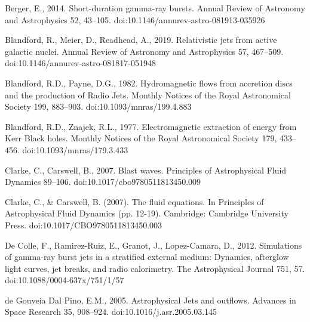 \documentclass[12pt,a4paper]{book}
\begin{document}
\begin{thebibliography}{40}

Berger, E., 2014. Short-duration gamma-ray bursts. Annual Review of Astronomy and Astrophysics 52, 43–105. doi:10.1146/annurev-astro-081913-035926 

 Blandford, R., Meier, D., Readhead, A., 2019. Relativistic jets from active galactic nuclei. Annual Review of Astronomy and Astrophysics 57, 467–509. doi:10.1146/annurev-astro-081817-051948 

 Blandford, R.D., Payne, D.G., 1982. Hydromagnetic flows from accretion discs and the production of Radio Jets. Monthly Notices of the Royal Astronomical Society 199, 883–903. 
doi:10.1093/mnras/199.4.883 

 Blandford, R.D., Znajek, R.L., 1977. Electromagnetic extraction of energy from Kerr Black holes. Monthly Notices of the Royal Astronomical Society 179, 433–456. 
doi:10.1093/mnras/179.3.433

Clarke, C., Carswell, B., 2007. Blast waves. Principles of Astrophysical Fluid Dynamics 89–106. doi:10.1017/cbo9780511813450.009 

Clarke, C., \& Carswell, B. (2007). The fluid equations. In Principles of Astrophysical Fluid Dynamics (pp. 12-19). 
Cambridge: Cambridge University Press. doi:10.1017/CBO9780511813450.003

 De Colle, F., Ramirez-Ruiz, E., Granot, J., Lopez-Camara, D., 2012. Simulations of gamma-ray burst jets in a stratified external medium: Dynamics, afterglow light 
curves, jet breaks, and radio calorimetry. The Astrophysical Journal 751, 57. doi:10.1088/0004-637x/751/1/57 

 de Gouveia Dal Pino, E.M., 2005. Astrophysical Jets and outflows. Advances in Space Research 35, 908–924. doi:10.1016/j.asr.2005.03.145 


\end{thebibliography}
\end{document}
